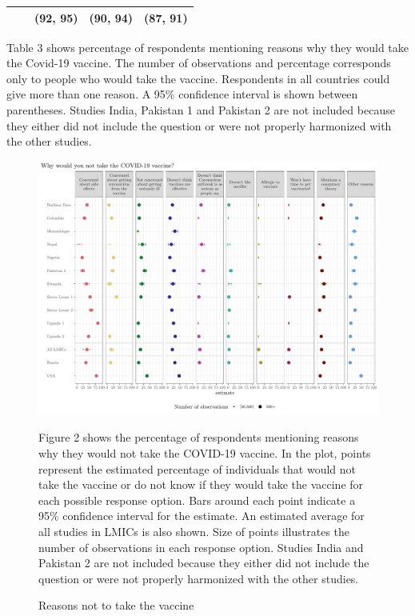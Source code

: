 \documentclass[
  12pt,
]{article}
\begin{document}
\begin{table}
\begin{threeparttable}
\begin{tabular}[t]{>{\raggedright\arraybackslash}p{8em}>{\centering\arraybackslash}p{4em}>{\centering\arraybackslash}p{4em}>{\centering\arraybackslash}p{4em}c}
 &  & (92, 95) & (90, 94) & (87, 91)\\
\bottomrule
\end{tabular}
\begin{tablenotes}
\item Table 3 shows percentage of respondents mentioning reasons why they would take the Covid-19 vaccine. The number of observations and percentage corresponds only to people who would take the vaccine. Respondents in all countries could give more than one reason. A 95\% confidence interval is shown between parentheses. Studies India, Pakistan 1 and Pakistan 2 are not included because they either did not include the question or were not properly harmonized with the other studies.
\end{tablenotes}
\end{threeparttable}
\end{table}

\begin{figure}[!ht]
\caption{Reasons not to take the vaccine \label{fig:fig2paper}}

\includegraphics{paper_files/figure-latex/fig2paper-1.pdf}

\scriptsize{Figure 2 shows the percentage of respondents mentioning reasons why they would not take the COVID-19 vaccine. In the plot, points represent the estimated percentage of individuals that would not take the vaccine or do not know if they would take the vaccine for each possible response option. Bars around each point indicate a 95\% confidence interval for the estimate. An estimated average for all studies in LMICs is also shown. Size of points illustrates the number of observations in each response option. Studies India and Pakistan 2 are not included because they either did not include the question or were not properly harmonized with the other studies.}
\end{figure}
\end{document}
